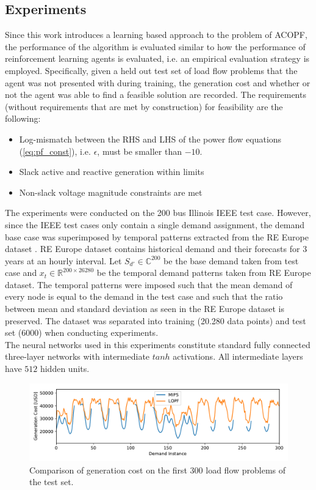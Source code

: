 \subsection{Experiments}
\label{sec:LOPFexperiments}
Since this work introduces a learning based approach to the problem of ACOPF, the performance of the algorithm is evaluated similar to how the performance of reinforcement learning agents is evaluated, i.e. an empirical evaluation strategy is employed. Specifically, given a held out test set of load flow problems that the agent was not presented with during training, the generation cost and whether or not the agent was able to find a feasible solution are recorded. The requirements (without requirements that are met by construction) for feasibility are the following:
\begin{itemize}
    \item Log-mismatch between the RHS and LHS of the power flow equations (\ref{eq:pf_const}), i.e. $\epsilon$, must be smaller than $-10$.
    \item Slack active and reactive generation within limits
    \item Non-slack voltage magnitude constraints are met
\end{itemize}

The experiments were conducted on the 200 bus Illinois IEEE test case. However, since the IEEE test cases only contain a single demand assignment, the demand base case was superimposed by temporal patterns extracted from the RE Europe dataset \cite{re_europe}. RE Europe dataset contains historical demand and their forecasts for 3 years at an hourly interval. Let $S_{d'} \in \mathbb{C}^{200}$ be the base demand taken from test case and $x_t \in \mathbb{R}^{200 \times 26280}$ be the temporal demand patterns taken from RE Europe dataset. The temporal patterns were imposed such that the mean demand of every node is equal to the demand in the test case and such that the ratio between mean and standard deviation as seen in the RE Europe dataset is preserved. The dataset was separated into training (20.280 data points) and test set (6000) when conducting experiments.\\
The neural networks used in this experiments constitute standard fully connected three-layer networks with intermediate $tanh$ activations. All intermediate layers have $512$ hidden units.

\begin{figure}[!ht]
    \centering
    \includegraphics[width=0.85\linewidth]{krtofl/cost_comapre_uart2.pdf}
    \caption{Comparison of generation cost on the first 300 load flow problems of the test set.}
    \label{lopf:cost}
\end{figure}

